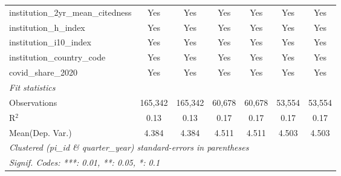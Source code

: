\begin{tabular}{lcccccc}
   institution\_2yr\_mean\_citedness                           & Yes            & Yes            & Yes           & Yes           & Yes           & Yes\\  
   institution\_h\_index                                       & Yes            & Yes            & Yes           & Yes           & Yes           & Yes\\  
   institution\_i10\_index                                     & Yes            & Yes            & Yes           & Yes           & Yes           & Yes\\  
   institution\_country\_code                                  & Yes            & Yes            & Yes           & Yes           & Yes           & Yes\\  
   covid\_share\_2020                                          & Yes            & Yes            & Yes           & Yes           & Yes           & Yes\\  
   \midrule
   \emph{Fit statistics}\\
   Observations                                                & 165,342        & 165,342        & 60,678        & 60,678        & 53,554        & 53,554\\  
   R$^2$                                                       & 0.13           & 0.13           & 0.17          & 0.17          & 0.17          & 0.17\\  
Mean(Dep. Var.) & 4.384 & 4.384 & 4.511 & 4.511 & 4.503 & 4.503 \\
   \midrule \midrule
   \multicolumn{7}{l}{\emph{Clustered (pi\_id \& quarter\_year) standard-errors in parentheses}}\\
   \multicolumn{7}{l}{\emph{Signif. Codes: ***: 0.01, **: 0.05, *: 0.1}}\\
\end{tabular}
\par\endgroup
